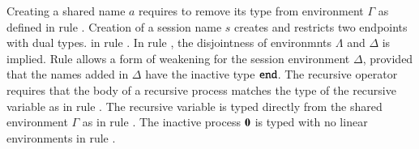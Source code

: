 Creating a
shared name $a$ requires to remove
its type from environment $\Gamma$ as defined in 
rule . 
Creation of a session name $s$
creates and restricts two endpoints with dual types. 
in rule . 
In rule , 
the disjointness of environmnts $\Lambda$ and $\Delta$
is implied. Rule  allows a form of weakening 
for the session environment $\Delta$, provided that
the names added in $\Delta$ have the inactive
type $\mathtt{end}$. 
The recursive operator requires that the body of
a recursive process matches the type of the recursive
variable as in rule .
The recursive variable is typed
directly from the shared environment $\Gamma$ as
in rule .
The inactive process $\mathbf{0}$ is typed with no
linear environments in rule . 




